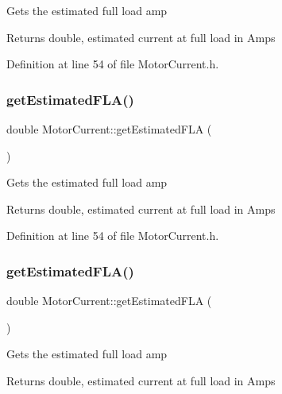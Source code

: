 Gets the estimated full load amp \begin{DoxyReturn}{Returns}
double, estimated current at full load in Amps 
\end{DoxyReturn}


Definition at line 54 of file Motor\+Current.\+h.

\mbox{\label{class_motor_current_a0f845ec03585b21a8e476ed3e63f365f}} 
\subsubsection{\texorpdfstring{get\+Estimated\+F\+L\+A()}{getEstimatedFLA()}\hspace{0.1cm}{\footnotesize\ttfamily [2/3]}}
{\footnotesize\ttfamily double Motor\+Current\+::get\+Estimated\+F\+LA (\begin{DoxyParamCaption}{ }\end{DoxyParamCaption})\hspace{0.3cm}{\ttfamily [inline]}}

Gets the estimated full load amp \begin{DoxyReturn}{Returns}
double, estimated current at full load in Amps 
\end{DoxyReturn}


Definition at line 54 of file Motor\+Current.\+h.

\mbox{\label{class_motor_current_a0f845ec03585b21a8e476ed3e63f365f}} 
\subsubsection{\texorpdfstring{get\+Estimated\+F\+L\+A()}{getEstimatedFLA()}\hspace{0.1cm}{\footnotesize\ttfamily [3/3]}}
{\footnotesize\ttfamily double Motor\+Current\+::get\+Estimated\+F\+LA (\begin{DoxyParamCaption}{ }\end{DoxyParamCaption})\hspace{0.3cm}{\ttfamily [inline]}}

Gets the estimated full load amp \begin{DoxyReturn}{Returns}
double, estimated current at full load in Amps 
\end{DoxyReturn}


